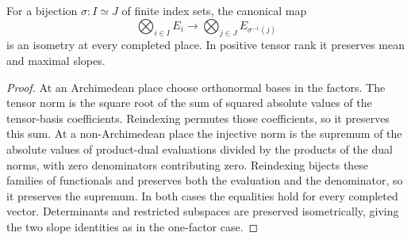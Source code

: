 \begin{lemma}
\label{lem:finite-tensor-reindex-isometry}
\leanok
For a bijection $\sigma:I\simeq J$ of finite index sets, the canonical map
\[
 \bigotimes_{i\in I} E_i\longrightarrow
 \bigotimes_{j\in J}E_{\sigma^{-1}(j)}
\]
is an isometry at every completed place. In positive tensor rank it
preserves mean and maximal slopes.
\end{lemma}
\begin{proof}
At an Archimedean place choose orthonormal bases in the factors.
The tensor norm is the square root of the sum of squared absolute values
of the tensor-basis coefficients. Reindexing permutes those coefficients,
so it preserves this sum. At a non-Archimedean place the injective norm
is the supremum of the absolute values of product-dual evaluations divided
by the products of the dual norms, with zero denominators contributing
zero. Reindexing bijects these families of functionals and preserves both
the evaluation and the denominator, so it preserves the supremum. In both cases
the equalities hold for every completed vector. Determinants and
restricted subspaces are preserved isometrically, giving the two slope
identities as in the one-factor case.
\end{proof}

